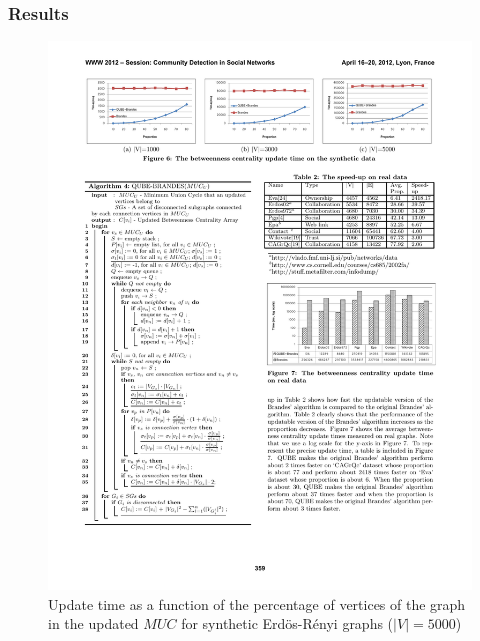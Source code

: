 \begin{frame}
  \frametitle{Results}

  \begin{figure}[t]
    \centering
    \includegraphics[width=\textwidth, height=0.7\textheight, keepaspectratio]{imgs/qube-results1}
    \caption{Update time as a function of the percentage of vertices of the graph in the updated $MUC$ for synthetic Erd\"{o}s-R\'{e}nyi graphs ($|V| = 5000$)}
  \end{figure}
    
\end{frame}


